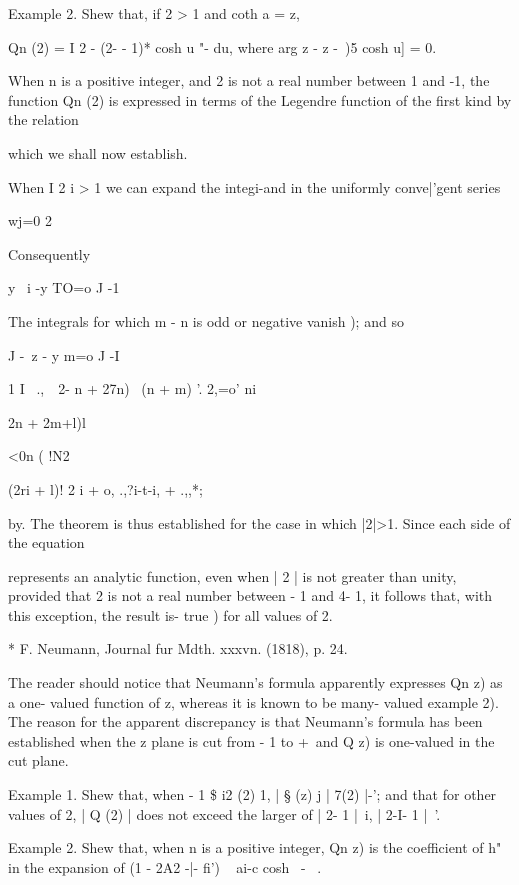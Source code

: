 {{Example 2. Shew that, if 2 > 1 and coth a = z,

Qn (2) = I 2 - (2- - 1)* cosh u "- du, where arg z - z -\ )5 cosh u] =
0. 


When n is a positive integer, and 2 is not a real number between 1 and
-1, the function Qn (2) is expressed in terms of the Legendre function
of the first kind by the relation

which we shall now establish.

When I 2 i > 1 we can expand the integi-and in the uniformly
conve|'gent series

wj=0 2

Consequently

 y \ i -y TO=o J -1

The integrals for which m - n is odd or negative vanish );
and so

  J -\ z - y m=o J -I

 1 I \ .,\, \, 2- n + 27n) \ (n + m) '. 2,=o' ni\ \ {2n + 2m+l)l

<0n ( !N2

(2ri + l)! 2 i + o, .,?i-t-i, + .,,*;

by. The theorem is thus established for the case in which
|2|>1. Since each side of the equation

represents an analytic function, even when | 2 | is not greater than
unity, provided that 2 is not a real number between - 1 and 4- 1, it
follows that, with this exception, the result is- true ) for all
values of 2.

* F. Neumann, Journal fur Mdth. xxxvn. (1818), p. 24.

%
%

The reader should notice that Neumann's formula apparently expresses
Qn z) as a one- valued function of z, whereas it is known to be many-
valued  example 2). The reason for the apparent discrepancy is
that Neumann's formula has been established when the z plane is cut
from - 1 to +\, and Q z) is one-valued in the cut plane.

Example 1. Shew that, when - 1 \$ i2 (2) 1, | § (z) j | 7(2) |-'; and
that for other values of 2, | Q (2) | does not exceed the larger of |
2- 1 |~i, | 2-I- 1 |~'.

Example 2. Shew that, when n is a positive integer, Qn z) is the
coefficient of h" in the expansion of (1 - 2A2 -|- fi') ~ ai-c cosh \
- \ .

}}}
